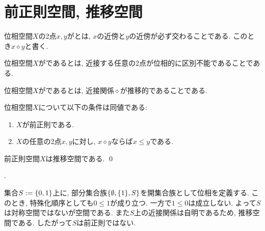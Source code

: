 \documentclass[uplatex, dvipdfmx, a4paper, 12pt, class=jsbook, crop=false]{standalone}
\begin{document}
\section{前正則空間, 推移空間}
\label{sec:preregular-spaces}

\newcommand{\topleq}{\leq}
\newcommand{\topnear}{\mathrel{\diamond}}
\newcommand{\convto}{\rightsquigarrow}
\newcommand{\Llim}{\mathop{\mathrm{Lim}}\nolimits}

\begin{definition}
	位相空間\(X\)の2点\(x, y\)がとは,
	\(x\)の近傍と\(y\)の近傍が必ず交わることである.
	このとき\(x \topnear y\)と書く.
\end{definition}

\begin{definition}
	位相空間\(X\)がであるとは,
	近接する任意の2点が位相的に区別不能であることである.
\end{definition}

\begin{definition}
	位相空間\(X\)がであるとは,
	近接関係\(\topnear\)が推移的であることである.
\end{definition}

\begin{proposition}
	位相空間\(X\)について以下の条件は同値である:
	\begin{enumerate}
		\item \(X\)が前正則である.
		\item \(X\)の任意の2点\(x, y\)に対し, \(x \topnear y\)ならば\(x \leq y\)である.
	\end{enumerate}
\end{proposition}

\begin{proposition}
	前正則空間\(X\)は推移空間である.
	\qed
\end{proposition}

\begin{example}[\Sierpinski 空間]
	\WIP.

	集合\(S \defeq \lrbrace{0, 1}\)上に,
	部分集合族\(\lrbrace{\emptyset, \lrbrace{1}, S}\)を開集合族として位相を定義する.
	このとき, 特殊化順序としても\(0 \leq 1\)が成り立つ.
	一方で\(1 \leq 0\)は成立しない.
	よって\(S\)は対称空間ではないが空間である.
	また\(S\)上の近接関係は自明であるため, 推移空間である.
	したがって\(S\)は前正則ではない.
\end{example}
\end{document}
